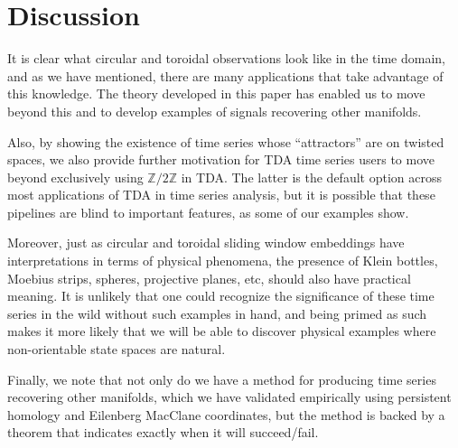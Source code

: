 \documentclass[11pt]{article}
\theoremstyle{definition}
\theoremstyle{remark}
\begin{document}
    \section{Discussion}

    It is clear what circular and toroidal observations look like in the time domain, and as we have mentioned, there are many applications that take advantage of this knowledge.  The theory developed in this paper has enabled us to move beyond this and to develop examples of signals recovering other manifolds.
    
    Also, by showing the existence of time series whose ``attractors'' are on twisted spaces, we also provide further motivation for TDA time series users to move beyond exclusively using $\mathbb{Z} / 2 \mathbb{Z}$ in TDA.  The latter is the default option across most applications of TDA in time series analysis, but it is possible that these pipelines are blind to important features, as some of our examples show.  
    
    Moreover, just as circular and toroidal sliding window embeddings have interpretations in terms of physical phenomena, the presence of Klein bottles, Moebius strips, spheres, projective planes, etc, should also have practical meaning. It is unlikely that one could recognize the significance of these time series in the wild without such examples in hand, and being primed as such makes it more likely that we will be able to discover physical examples where non-orientable state spaces are natural.
    
    Finally, we note that not only do we have a method for producing time series recovering other manifolds, which we have validated empirically using persistent homology and Eilenberg MacClane coordinates, but the method is backed by a theorem that indicates exactly when it will succeed/fail.






    
    

    
\end{document}
